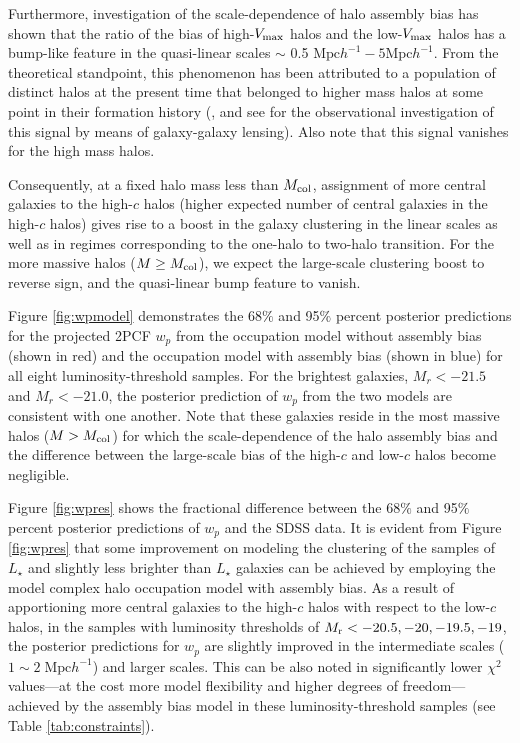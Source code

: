 Furthermore, investigation of the scale-dependence of halo assembly bias has shown that the ratio of the bias of high-$V_{\rm max}$ halos and the low-$V_{\rm max}$ halos has a bump-like feature in the quasi-linear scales $\sim$ 0.5 $\mathrm{Mpc}h^{-1}-5\mathrm{Mpc}h^{-1}$. From the theoretical standpoint, this phenomenon has been attributed to a population of distinct halos at the present time that belonged to higher mass halos at some point in their formation history (\citealt{sunayama2016}, and see \citealt{more2016} for the observational investigation of this signal by means of galaxy-galaxy lensing). Also note that this signal vanishes for the high mass halos. 

Consequently, at a fixed halo mass less than $M_{\rm col}$, assignment of more central galaxies to the high-$c$ halos (higher expected number of central galaxies in the high-$c$ halos) gives rise to a boost in the galaxy clustering in the linear scales as well as in regimes corresponding to the one-halo to two-halo transition. For the more massive halos ($M \geq M_{\rm col}$), we expect the large-scale clustering boost to reverse sign, and the quasi-linear bump feature to vanish.  

Figure \ref{fig:wpmodel} demonstrates the 68$\%$ and 95$\%$ percent posterior predictions for the projected 2PCF $w_{p}$ from the occupation model without assembly bias (shown in red) and the occupation model with assembly bias (shown in blue) for all eight luminosity-threshold samples. For the brightest galaxies, $M_{r} < -21.5$ and $M_{r} < -21.0$, the posterior prediction of $w_{p}$ from the two models are consistent with one another. Note that these galaxies reside in the most massive halos ($M > M_{\rm col}$) for which the scale-dependence of the halo assembly bias and the difference between the large-scale bias of the high-$c$ and low-$c$ halos become negligible. 

Figure \ref{fig:wpres} shows the fractional difference between the 68$\%$ and 95$\%$ percent posterior predictions of $w_p$ and the SDSS data. It is evident from Figure \ref{fig:wpres} that some improvement on modeling the clustering of the samples of $L_{\star}$ and slightly less brighter than $L_{\star}$ galaxies can be achieved by employing the model complex halo occupation model with assembly bias. As a result of apportioning more central galaxies to the high-$c$ halos with respect to the low-$c$ halos, in the samples with luminosity thresholds of $M_{\rm r}<-20.5, -20, -19.5, -19$, the posterior predictions for $w_{p}$ are slightly improved in the intermediate scales ($1\sim 2 \; \mathrm{Mpc} h^{-1}$) and larger scales. This can be also noted in significantly lower $\chi^{2}$ values---at the cost more model flexibility and higher degrees of freedom---achieved by the assembly bias model in these luminosity-threshold samples (see Table \ref{tab:constraints}).  


